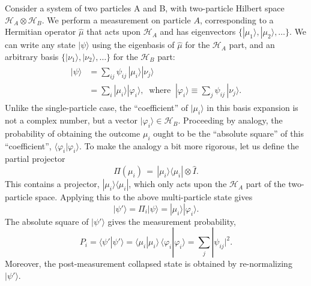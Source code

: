 \documentclass[pra,12pt]{revtex4}
\begin{document}
Consider a system of two particles A and B, with two-particle Hilbert
space $\mathscr{H}_A \otimes \mathscr{H}_B$.  We perform a measurement
on particle $A$, corresponding to a Hermitian operator $\hat{\mu}$
that acts upon $\mathscr{H}_A$ and has eigenvectors $\{|\mu_1\rangle,
|\mu_2\rangle,\dots\}$.  We can write any state $|\psi\rangle$ using
the eigenbasis of $\hat{\mu}$ for the $\mathscr{H}_A$ part, and an
arbitrary basis $\{|\nu_1\rangle, |\nu_2\rangle,\dots\}$ for the
$\mathscr{H}_B$ part:
\begin{align}
  \begin{aligned}|\psi\rangle &= \sum_{ij} \psi_{ij}\, |\mu_i\rangle |\nu_j\rangle \\&= \sum_i |\mu_i\rangle |\varphi_i\rangle, \;\;\mathrm{where}\;\;|\varphi_i\rangle\equiv \sum_j \psi_{ij}\,|\nu_j\rangle.\end{aligned}
\end{align}
Unlike the single-particle case, the ``coefficient'' of
$|\mu_i\rangle$ in this basis expansion is not a complex number, but a
vector $|\varphi_i\rangle \in \mathscr{H}_B$.  Proceeding by analogy,
the probability of obtaining the outcome $\mu_i$ ought to be the
``absolute square'' of this ``coefficient'',
$\langle\varphi_i|\varphi_i\rangle$.  To make the analogy a bit more
rigorous, let us define the partial projector
\begin{equation}
  \hat{\Pi}(\mu_i) \,=\, |\mu_i\rangle\langle \mu_i| \otimes  \hat{I}.
\end{equation}
This contains a projector, $|\mu_i\rangle\langle \mu_i|$, which only
acts upon the $\mathscr{H}_A$ part of the two-particle space.
Applying this to the above multi-particle state gives
\begin{equation}
  |\psi'\rangle = \Pi_i |\psi\rangle = |\mu_i\rangle |\varphi_i\rangle.
\end{equation}
The absolute square of $|\psi'\rangle$ gives the measurement
probability,
\begin{equation}
  P_i = \langle\psi'|\psi'\rangle = \langle \mu_i|\mu_i\rangle\, \langle \varphi_i|\varphi_i\rangle = \sum_j |\psi_{ij}|^2.
\end{equation}
Moreover, the post-measurement collapsed state is obtained by
re-normalizing $|\psi'\rangle$.
\end{document}
